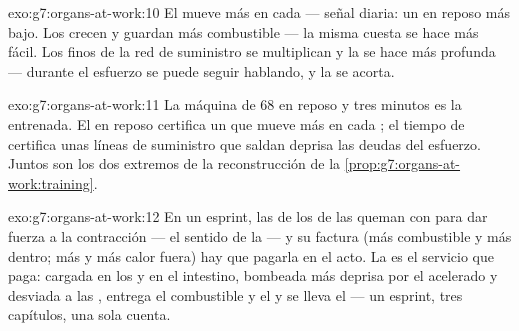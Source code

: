 \begin{solution}{exo:g7:organs-at-work:10}
El  mueve más  en cada  --- señal diaria: un 
en reposo más bajo. Los  crecen y guardan más combustible ---
la misma cuesta se hace más fácil. Los  finos de la red de
suministro se multiplican y la  se hace más profunda ---
durante el esfuerzo se puede seguir hablando, y la  se
acorta.
\end{solution}

\begin{solution}{exo:g7:organs-at-work:11}
La máquina de $68$ en reposo y tres minutos es la entrenada. El 
en reposo certifica un  que mueve más en cada ; el tiempo
de  certifica unas líneas de suministro que saldan deprisa
las deudas del esfuerzo. Juntos son los dos extremos de la
reconstrucción de la \cref{prop:g7:organs-at-work:training}.
\end{solution}

\begin{solution}{exo:g7:organs-at-work:12}
En un esprint, las  de los  de las  queman
 con  para dar fuerza a la contracción --- el sentido de
la  --- y su factura (más combustible y más  dentro;
más  y más calor fuera) hay que pagarla en el acto.
La  es el servicio que paga: cargada en los  y en el
intestino, bombeada más deprisa por el  acelerado y desviada a
las , entrega el combustible y el  y se lleva el  --- un esprint, tres capítulos, una sola cuenta.
\end{solution}

